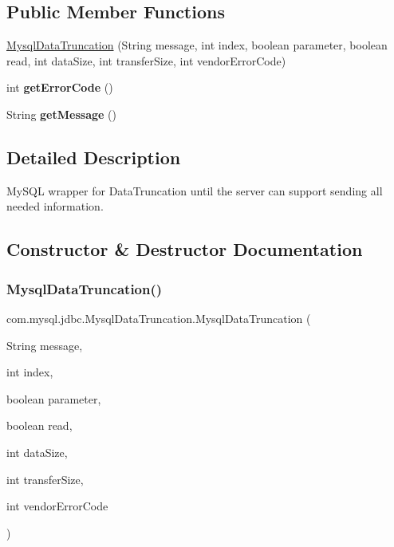 \subsection*{Public Member Functions}
\begin{DoxyCompactItemize}
\item 
\mbox{\hyperlink{classcom_1_1mysql_1_1jdbc_1_1_mysql_data_truncation_af52aaf860ff214c176dcf1dd5170ea79}{Mysql\+Data\+Truncation}} (String message, int index, boolean parameter, boolean read, int data\+Size, int transfer\+Size, int vendor\+Error\+Code)
\item 
\mbox{\label{classcom_1_1mysql_1_1jdbc_1_1_mysql_data_truncation_ababb45f112500271daef1ea0f85894e4}} 
int {\bfseries get\+Error\+Code} ()
\item 
\mbox{\label{classcom_1_1mysql_1_1jdbc_1_1_mysql_data_truncation_a31e28df95f3b8ab1f7ed634725975154}} 
String {\bfseries get\+Message} ()
\end{DoxyCompactItemize}


\subsection{Detailed Description}
My\+S\+QL wrapper for Data\+Truncation until the server can support sending all needed information. 

\subsection{Constructor \& Destructor Documentation}
\mbox{\label{classcom_1_1mysql_1_1jdbc_1_1_mysql_data_truncation_af52aaf860ff214c176dcf1dd5170ea79}} 
\subsubsection{\texorpdfstring{Mysql\+Data\+Truncation()}{MysqlDataTruncation()}}
{\footnotesize\ttfamily com.\+mysql.\+jdbc.\+Mysql\+Data\+Truncation.\+Mysql\+Data\+Truncation (\begin{DoxyParamCaption}\item[{String}]{message,  }\item[{int}]{index,  }\item[{boolean}]{parameter,  }\item[{boolean}]{read,  }\item[{int}]{data\+Size,  }\item[{int}]{transfer\+Size,  }\item[{int}]{vendor\+Error\+Code }\end{DoxyParamCaption})}

